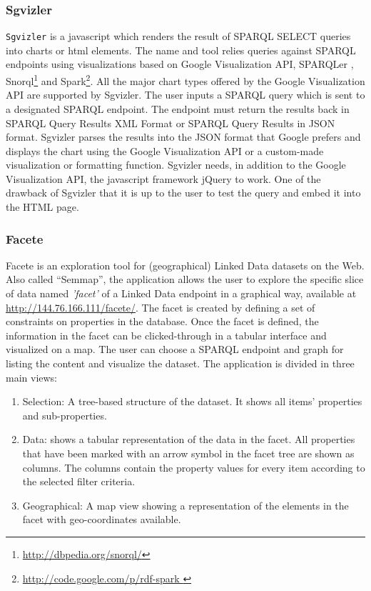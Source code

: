\subsubsection{Sgvizler}
\texttt{Sgvizler} \cite{Martin2012} is a javascript which renders the result of SPARQL SELECT queries into charts or html elements. The name and tool relies queries against SPARQL endpoints using visualizations based on Google Visualization API, SPARQLer , Snorql\footnote{\url{http://dbpedia.org/snorql/}} and Spark\footnote{\url{http://code.google.com/p/rdf-spark }}. All the major chart types offered by the Google Visualization API are supported by Sgvizler. The user inputs a SPARQL query which is sent to a designated SPARQL endpoint. The endpoint must return the results back in SPARQL Query Results XML Format or SPARQL Query Results in JSON format. Sgvizler parses the results into the JSON format that Google prefers and displays the chart using the Google Visualization API or a custom-made visualization or formatting function. Sgvizler needs, in addition to the Google Visualization API, the javascript framework jQuery  to work. One of the drawback of Sgvizler that it is up to the user to test the query and embed it into the HTML page.

\subsubsection{Facete}
Facete \cite{facete:2014} is an exploration tool for (geographical) Linked Data datasets on the Web. Also called ``Semmap'', the application allows the user to explore the specific slice of data named \textit{'facet'}  of a Linked Data endpoint in a graphical way, available at \url{http://144.76.166.111/facete/}. The facet is created by defining a set of constraints on properties in the database. Once the facet is defined, the information in the facet can be clicked-through in a tabular interface and visualized on a map. The user can choose a SPARQL endpoint and graph for listing the content and visualize the dataset. The application is divided in three main views:
\begin{enumerate}
\item Selection: A tree-based structure of the dataset. It shows all items' properties and sub-properties.
\item  Data: shows a tabular representation of the data in the facet. All properties that have been marked with an arrow symbol in the facet tree are shown as columns. The columns contain the property values for every item according to the selected filter criteria.
\item Geographical: A map view showing a representation of the elements in the facet with geo-coordinates available.
\end{enumerate}

